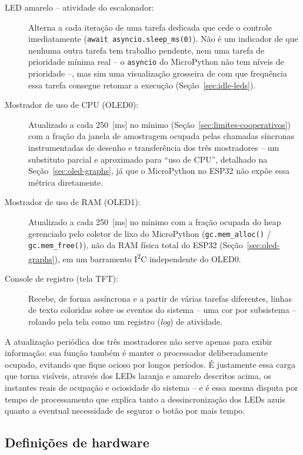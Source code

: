 \documentclass[12pt,a4paper]{article}
\begin{document}
\begin{description}
  \item[LED amarelo -- atividade do escalonador:] Alterna a cada iteração de uma tarefa dedicada que cede o controle imediatamente (\texttt{await asyncio.sleep\_ms(0)}). Não é um indicador de que nenhuma outra tarefa tem trabalho pendente, nem uma tarefa de prioridade mínima real -- o \texttt{asyncio} do MicroPython não tem níveis de prioridade --, mas sim uma visualização grosseira de com que frequência essa tarefa consegue retomar a execução (Seção~\ref{sec:idle-leds}).

  \item[Mostrador de uso de CPU (OLED0):] Atualizado a cada 250~[ms] no mínimo (Seção~\ref{sec:limites-cooperativos}) com a fração da janela de amostragem ocupada pelas chamadas síncronas instrumentadas de desenho e transferência dos três mostradores -- um substituto parcial e aproximado para \enquote{uso de CPU}, detalhado na Seção~\ref{sec:oled-graphs}, já que o MicroPython no ESP32 não expõe essa métrica diretamente.

  \item[Mostrador de uso de RAM (OLED1):] Atualizado a cada 250~[ms] no mínimo com a fração ocupada do heap gerenciado pelo coletor de lixo do MicroPython (\texttt{gc.mem\_alloc()} / \texttt{gc.mem\_free()}), não da RAM física total do ESP32 (Seção~\ref{sec:oled-graphs}), em um barramento I\textsuperscript{2}C independente do OLED0.

  \item[Console de registro (tela TFT):] Recebe, de forma assíncrona e a partir de várias tarefas diferentes, linhas de texto coloridas sobre os eventos do sistema -- uma cor por subsistema -- rolando pela tela como um registro (\textit{log}) de atividade.
\end{description}

A atualização periódica dos três mostradores não serve apenas para exibir informação: sua função também é manter o processador deliberadamente ocupado, evitando que fique ocioso por longos períodos. É justamente essa carga que torna visíveis, através dos LEDs laranja e amarelo descritos acima, os instantes reais de ocupação e ociosidade do sistema -- e é essa mesma disputa por tempo de processamento que explica tanto a dessincronização dos LEDs azuis quanto a eventual necessidade de segurar o botão por mais tempo.

\subsection{Definições de hardware}
\end{document}
